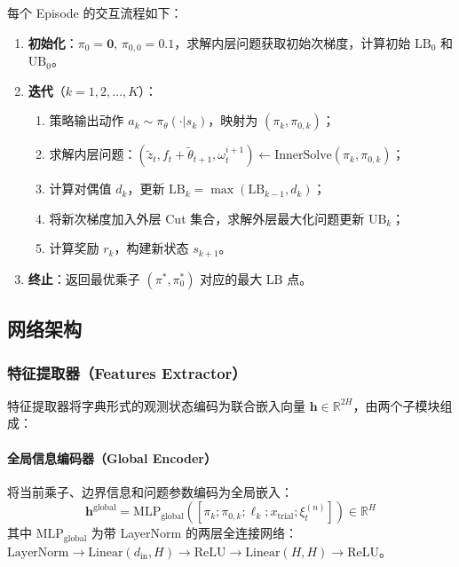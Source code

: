 \documentclass[11pt]{ctexart}
\begin{document}
每个 Episode 的交互流程如下：
\begin{enumerate}[itemsep=2pt, topsep=2pt]
    \item \textbf{初始化}：$\pi_0 = \mathbf{0}$, $\pi_{0,0} = 0.1$，求解内层问题获取初始次梯度，计算初始 $\mathrm{LB}_0$ 和 $\mathrm{UB}_0$。
    \item \textbf{迭代}（$k = 1, 2, \ldots, K$）：
    \begin{enumerate}[itemsep=1pt, topsep=1pt]
        \item 策略输出动作 $a_k \sim \pi_\theta(\cdot | s_k)$，映射为 $(\pi_k, \pi_{0,k})$；
        \item 求解内层问题：$(\tilde{z}_t, f_t + \tilde{\theta}_{t+1}, \omega_t^{i+1}) \leftarrow \text{InnerSolve}(\pi_k, \pi_{0,k})$；
        \item 计算对偶值 $d_k$，更新 $\mathrm{LB}_k = \max(\mathrm{LB}_{k-1}, d_k)$；
        \item 将新次梯度加入外层 Cut 集合，求解外层最大化问题更新 $\mathrm{UB}_k$；
        \item 计算奖励 $r_k$，构建新状态 $s_{k+1}$。
    \end{enumerate}
    \item \textbf{终止}：返回最优乘子 $(\pi^*, \pi_0^*)$ 对应的最大 $\mathrm{LB}$ 点。
\end{enumerate}


\subsection{网络架构}

\subsubsection{特征提取器（Features Extractor）}

特征提取器将字典形式的观测状态编码为联合嵌入向量 $\mathbf{h} \in \mathbb{R}^{2H}$，由两个子模块组成：

\paragraph{全局信息编码器（Global Encoder）}
将当前乘子、边界信息和问题参数编码为全局嵌入：
\begin{equation}
\mathbf{h}^{\text{global}} = \mathrm{MLP}_{\text{global}}\!\left( \left[ \pi_k; \pi_{0,k}; \ell_k; x_{\text{trial}}; \xi_t^{(n)} \right] \right) \in \mathbb{R}^{H}
\end{equation}
其中 $\mathrm{MLP}_{\text{global}}$ 为带 LayerNorm 的两层全连接网络：$\text{LayerNorm} \to \mathrm{Linear}(d_{\text{in}}, H) \to \mathrm{ReLU} \to \mathrm{Linear}(H, H) \to \mathrm{ReLU}$。
\end{document}
